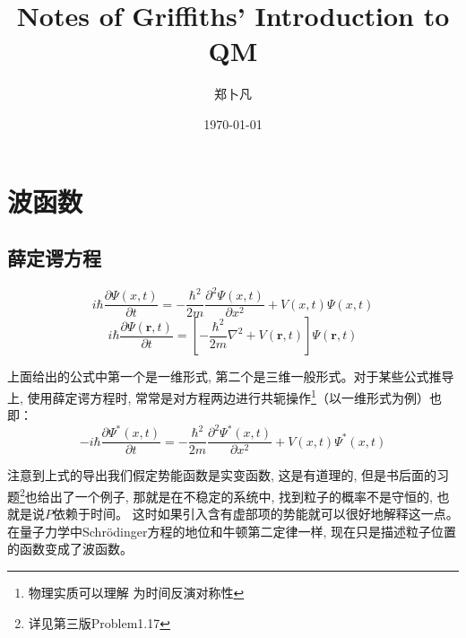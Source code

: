 \documentclass[a4paper,zihao=-4,linespread=1]{ctexrep}
\title{Notes of Griffiths' Introduction to QM}   %
\author{郑卜凡}                     %
\date{\today}                             %
\newenvironment{lequation}{\large\begin{equation}}{\end{equation}}
\begin{document}
    \maketitle              %
    \tableofcontents        %
    \setcounter{page}{0}
    \thispagestyle{empty}
    \chapter{波函数}
    \section{薛定谔方程}
    \begin{lequation}\label{S-1-D}
        \boxed{
            i\hbar\frac{\partial \Psi\left(x,t\right)}{\partial t}=-\frac{\hbar^{2}}{2m}\frac{\partial^{2}\Psi\left(x,t\right)}{\partial x^{2}}+
            V\left(x,t\right)\Psi\left(x,t\right)
        }
    \end{lequation}
    \begin{lequation}\label{S-3-D}
        \boxed{
            i\hbar\frac{\partial \Psi\left(\bm{r},t\right)}{\partial t}=\left[-\frac{\hbar^{2}}{2m}\nabla^{2}+
            V\left(\bm{r},t\right)\right]\Psi\left(\bm{r},t\right) 
        }
    \end{lequation}


    上面给出的公式中第一个是一维形式, 第二个是三维一般形式。对于某些公式推导上, 使用薛定谔方程时, 常常是对方程两边进行共轭操作\footnote{物理实质可以理解
    为时间反演对称性}（以一维形式为例）也即：
    \begin{lequation}
        -i\hbar\frac{\partial \Psi^{*}\left(x,t\right)}{\partial t}=-\frac{\hbar^{2}}{2m}\frac{\partial^{2}\Psi^{*}\left(x,t\right)}{\partial x^{2}}+
        V\left(x,t\right)\Psi^{*}\left(x,t\right)
    \end{lequation}


    注意到上式的导出我们假定势能函数是实变函数, 这是有道理的, 但是书后面的习题\footnote{详见第三版Problem1.17}也给出了一个例子, 那就是在不稳定的系统中, 找到粒子的概率不是守恒的, 也就是说$P$依赖于时间。
    这时如果引入含有虚部项的势能就可以很好地解释这一点。在量子力学中Schr{\"o}dinger方程的地位和牛顿第二定律一样, 现在只是描述粒子位置的函数变成了波函数。
\end{document}
